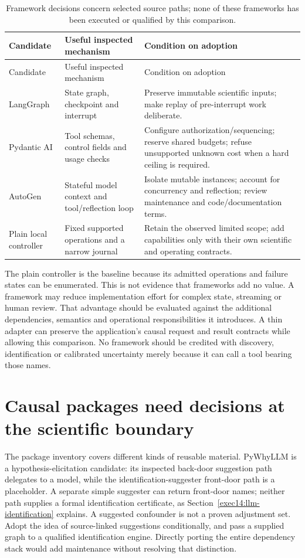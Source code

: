 \begin{longtable}{@{}P{.20\textwidth}P{.35\textwidth}P{.38\textwidth}@{}}
\caption{Framework decisions concern selected source paths; none of these
frameworks has been executed or qualified by this comparison.}\\
\toprule Candidate & Useful inspected mechanism & Condition on adoption\\\midrule
\endfirsthead
\toprule Candidate & Useful inspected mechanism & Condition on adoption\\\midrule
\endhead
LangGraph & State graph, checkpoint and interrupt & Preserve immutable
scientific inputs; make replay of pre-interrupt work deliberate.\\
Pydantic AI & Tool schemas, control fields and usage checks & Configure
authorization/sequencing; reserve shared budgets; refuse unsupported unknown
cost when a hard ceiling is required.\\
AutoGen & Stateful model context and tool/reflection loop & Isolate mutable
instances; account for concurrency and reflection; review maintenance and
code/documentation terms.\\
Plain local controller & Fixed supported operations and a narrow journal &
Retain the observed limited scope; add capabilities only with their own
scientific and operating contracts.\\
\bottomrule
\end{longtable}

The plain controller is the baseline because its admitted operations and
failure states can be enumerated. This is not evidence that frameworks add
no value. A framework may reduce implementation effort for complex state,
streaming or human review. That advantage should be evaluated against the
additional dependencies, semantics and operational responsibilities it
introduces. A thin adapter can preserve the application's causal request
and result contracts while allowing this comparison. No framework should
be credited with discovery, identification or calibrated uncertainty merely
because it can call a tool bearing those names.

\section{Causal packages need decisions at the scientific boundary}

The package inventory covers different kinds of reusable material. PyWhyLLM
is a hypothesis-elicitation candidate: its inspected back-door suggestion
path delegates to a model, while the identification-suggester front-door
path is a placeholder. A separate simple suggester can return front-door
names; neither path supplies a formal identification certificate, as
Section~\ref{exec14:llm-identification} explains. A suggested confounder is
not a proven adjustment set. Adopt
the idea of source-linked suggestions conditionally, and pass a supplied
graph to a qualified identification engine. Directly porting the entire
dependency stack would add maintenance without resolving that distinction.
\citep{v12_la_package_pywhy_llm}


